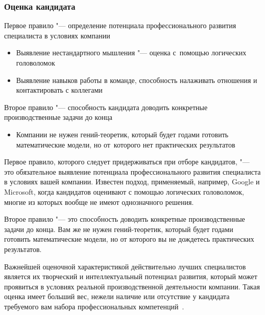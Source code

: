 \documentclass{../industrial-development}
\begin{document}
\begin{frame} \frametitle{Оценка кандидата}

Первое правило "--- определение потенциала профессионального развития специалиста в условиях компании
  \begin{itemize}
	\item Выявление нестандартного мышления "--- оценка с~помощью логических головоломок
	\item Выявление навыков работы в команде, способность налаживать отношения и контактировать с коллегами
	  \end{itemize}

 Второе правило "--- способность кандидата доводить конкретные производственные задачи до конца 
		  \begin{itemize}
		\item Компании не нужен гений-теоретик, который будет годами готовить математические модели, но от~которого нет практических результатов
	
  \end{itemize}
\end{frame}

\lecturenotes

Первое правило, которого следует придерживаться при отборе кандидатов, "--- это обязательное выявление потенциала профессионального развития специалиста в условиях вашей компании. Известен подход, применяемый, например, Google и Microsoft, когда кандидатов оценивают с помощью логических головоломок, многие из которых вообще не имеют однозначного решения.

Второе правило "--- это способность доводить конкретные производственные задачи до конца. Вам же не нужен гений-теоретик, который будет годами готовить математические модели, но от которого вы не дождетесь практических результатов.

Важнейшей оценочной характеристикой действительно лучших специалистов является их творческий и интеллектуальный потенциал развития, который может проявиться в условиях реальной производственной деятельности компании. Такая оценка имеет больший вес, нежели наличие или отсутствие у кандидата требуемого вам набора профессиональных компетенций~\cite[с.~287]{Pererva}.
\end{document}

